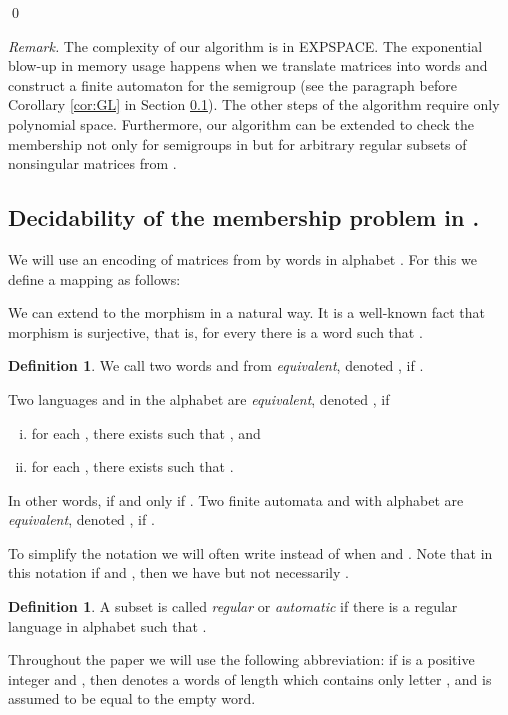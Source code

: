 \documentclass[fontsize=11pt,DIV=13,paper=letter]{scrartcl}
\theoremstyle{definition}
\newtheorem{definition}[theorem]{Definition}
\begin{document}
\qed

{\it Remark.} The complexity of our algorithm is in EXPSPACE. The exponential blow-up in memory usage happens when we translate matrices into words and construct a finite automaton for the semigroup  (see the paragraph before Corollary \ref{cor:GL} in Section \ref{GL}). The other steps of the algorithm require only polynomial space.
Furthermore, our algorithm can be extended to check the membership not only for semigroups in  but for arbitrary regular subsets of nonsingular matrices from .

\subsection{Decidability of the membership problem in .}\label{GL}

We will use an encoding of matrices from  by words in alphabet . For this we define a mapping  as follows:

We can extend  to the morphism  in a natural way. It is a well-known fact that morphism  is surjective, that is, for every  there is a word  such that .

\begin{definition}
We call two words  and  from  \emph{equivalent}, denoted , if .

Two languages  and  in the alphabet  are \emph{equivalent}, denoted , if
\begin{enumerate}[(i)]
\item for each , there exists  such that , and
\item for each , there exists  such that .
\end{enumerate}
In other words,  if and only if .
Two finite automata  and  with alphabet  are \emph{equivalent}, denoted , if .
\end{definition}

To simplify the notation we will often write  instead of  when  and . Note that in this notation if  and , then we have  but not necessarily .

\begin{definition}
A subset  is called \emph{regular} or \emph{automatic} if there is a regular language  in alphabet  such that .
\end{definition}

Throughout the paper we will use the following abbreviation: if  is a positive integer and , then  denotes a words of length  which contains only letter , and  is assumed to be equal to the empty word.
\end{document}

